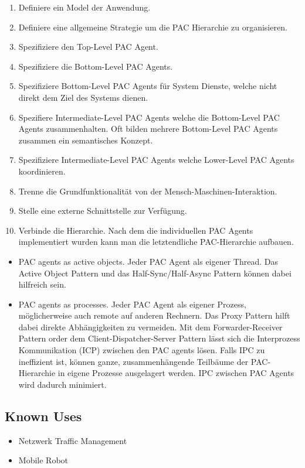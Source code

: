 \begin{enumerate}
	\item  Definiere ein Model der Anwendung.
	\item  Definiere eine allgemeine Strategie um die PAC Hierarchie zu organisieren.
	\item  Spezifiziere den Top-Level PAC Agent.
	\item  Spezifiziere die Bottom-Level PAC Agents.
	\item  Spezifiziere Bottom-Level PAC Agents für System Dienste, welche nicht direkt dem Ziel des Systems dienen.
	\item  Spezifiere Intermediate-Level PAC Agents welche die Bottom-Level PAC Agents zusammenhalten. Oft bilden mehrere Bottom-Level PAC Agents zusammen ein semantisches Konzept.
	\item  Spezifiziere Intermediate-Level PAC Agents welche Lower-Level PAC Agents koordinieren.
	\item  Trenne die Grundfunktionalität von der Mensch-Maschinen-Interaktion.
	\item  Stelle eine externe Schnittstelle zur Verfügung.
	\item Verbinde die Hierarchie. Nach dem die individuellen PAC Agents implementiert wurden kann man die letztendliche PAC-Hierarchie aufbauen.
\end{enumerate}


\begin{itemize}
	\item PAC agents as active objects. Jeder PAC Agent als eigener Thread. Das Active Object Pattern und das Half-Sync/Half-Async Pattern können dabei hilfreich sein.
	\item PAC agents as processes. Jeder PAC Agent als eigener Prozess, möglicherweise auch remote auf anderen Rechnern. Das Proxy Pattern hilft dabei direkte Abhängigkeiten zu vermeiden. Mit dem Forwarder-Receiver Pattern order dem Client-Dispatcher-Server Pattern lässt sich die Interprozess Kommunikation (ICP) zwischen den PAC agents lösen. Falls IPC zu ineffizient ist, können ganze, zusammenhängende Teilbäume der PAC-Hierarchie in eigene Prozesse ausgelagert werden. IPC zwischen PAC Agents wird dadurch minimiert.
\end{itemize}

\subsection*{Known Uses}


\begin{itemize}
	\item Netzwerk Traffic Management
	\item Mobile Robot
\end{itemize}

